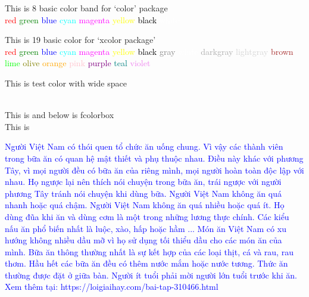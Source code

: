 \documentclass[12pt, a4paper]{report}
\begin{document}
\newpage

This is 8 basic color band for `color' package\\
\textcolor{red}{red} 
\textcolor{green}{green} 
\textcolor{blue}{blue} 
\textcolor{cyan}{cyan} 
\textcolor{magenta}{magenta} 
\textcolor{yellow}{yellow} 
\textcolor{black}{black} 
\textcolor{white}{white} 

This is 19 basic color for `xcolor package'\\
\textcolor{red}{red} 
\textcolor{green}{green} 
\textcolor{blue}{blue} 
\textcolor{cyan}{cyan} 
\textcolor{magenta}{magenta} 
\textcolor{yellow}{yellow} 
\textcolor{black}{black} 
\textcolor{gray}{gray} 
\textcolor{white}{white} 
\textcolor{darkgray}{darkgray} 
\textcolor{lightgray}{lightgray}
\textcolor{brown}{brown} 
\textcolor{lime}{lime} 
\textcolor{olive}{olive} 
\textcolor{orange}{orange} 
\textcolor{pink}{pink} 
\textcolor{purple}{purple} 
\textcolor{teal}{teal} 
\textcolor{violet}{violet} 


This is test color with wide space\\

\color{red}
\lipsum[1]\\
\color{black}


This is \colorbox{green}{\lipsum[1]} and below is fcolorbox\\
This is \\


\newpage

\selectfont

\textcolor{blue}
{
Người Việt Nam có thói quen tổ chức ăn uống chung.
Vì vậy các thành viên trong bữa ăn có quan hệ mật thiết và phụ thuộc nhau.
Điều này khác với phương Tây, vì mọi người đều có bữa ăn của riêng mình,
mọi người hoàn toàn độc lập với nhau. Họ ngược lại nên thích nói chuyện trong bữa ăn, 
trái ngược với người phương Tây tránh nói chuyện khi dùng bữa. 
Người Việt Nam không ăn quá nhanh hoặc quá chậm. Người Việt Nam không ăn quá nhiều hoặc quá ít.
Họ dùng đũa khi ăn và dùng cơm là một trong những lương thực chính. 
Các kiểu nấu ăn phổ biến nhất là luộc, xào, hấp hoặc hầm ...
Món ăn Việt Nam có xu hướng không nhiều dầu mỡ vì họ sử dụng tối thiểu dầu cho các món ăn của mình. 
Bữa ăn thông thường nhất là sự kết hợp của các loại thịt, cá và rau, rau thơm. 
Hầu hết các bữa ăn đều có thêm nước mắm hoặc nước tương.
Thức ăn thường được đặt ở giữa bàn. Người ít tuổi phải mời người lớn tuổi trước khi ăn.
Xem thêm tại: https://loigiaihay.com/bai-tap-310466.html
}
\end{document}
